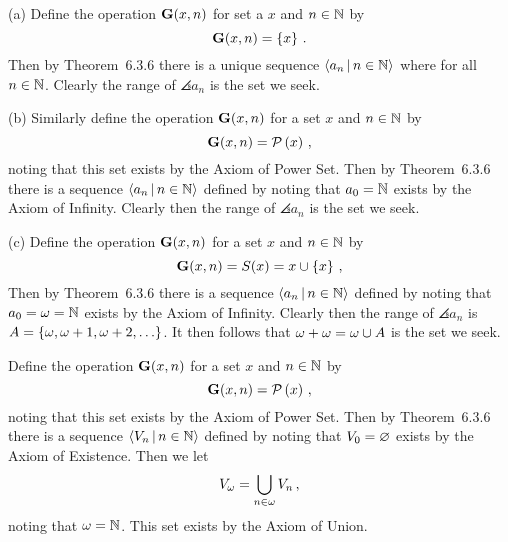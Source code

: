 
\begin{solution}
	(a) Define the operation $\mathbf{G}(x,n)$ for set a $x$ and $n \in \mathbb{N}$ by
    $$
    \mathbf{G}(x,n) = \left\{ x \right\} \,.
    $$
    Then by Theorem~6.3.6 there is a unique sequence $\left\langle a_n \,|\, n \in \mathbb{N} \right\rangle$ where
    for all $n \in \mathbb{N}$.
    Clearly the range of $\angles{a_n}$ is the set we seek. \qedsymbol

    (b) Similarly define the operation $\mathbf{G}(x,n)$ for a set $x$ and $n \in \mathbb{N}$ by
    $$
    \mathbf{G}(x,n) = \mathcal{P}\left(x\right) \,,
    $$
    noting that this set exists by the Axiom of Power Set.
    Then by Theorem~6.3.6 there is a sequence $\left\langle a_n \,|\, n \in \mathbb{N} \right\rangle$ defined by
    noting that $a_0 = \mathbb{N}$ exists by the Axiom of Infinity.
    Clearly then the range of $\angles{a_n}$ is the set we seek. \qedsymbol

    (c) Define the operation $\mathbf{G}(x,n)$ for a set $x$ and $n \in \mathbb{N}$ by
    $$
    \mathbf{G}(x,n) = S(x) = x \cup \left\{ x \right\} \,,
    $$
    Then by Theorem~6.3.6 there is a sequence $\left\langle a_n \,|\, n \in \mathbb{N} \right\rangle$ defined by
    noting that $a_0 = \omega = \mathbb{N}$ exists by the Axiom of Infinity.
    Clearly then the range of $\angles{a_n}$ is $A = \left\{ \omega, \omega+1, \omega+2, \ldots \right\}$.
    It then follows that  $\omega + \omega = \omega \cup A$ is the set we seek. \qedsymbol
\end{solution}


\begin{solution}
    Define the operation $\mathbf{G}(x,n)$ for a set $x$ and $n \in \mathbb{N}$ by
    $$
    \mathbf{G}(x,n) = \mathcal{P}\left(x\right) \,,
    $$
    noting that this set exists by the Axiom of Power Set.
    Then by Theorem~6.3.6 there is a sequence $\left\langle V_n \,|\, n \in \mathbb{N} \right\rangle$ defined by
    noting that $V_0 = \varnothing$ exists by the Axiom of Existence.
    Then we let
    $$
    V_\omega = \bigcup_{n \in \omega} V_n \,,
    $$
    noting that $\omega = \mathbb{N}$.
    This set exists by the Axiom of Union. \qedsymbol
\end{solution}

